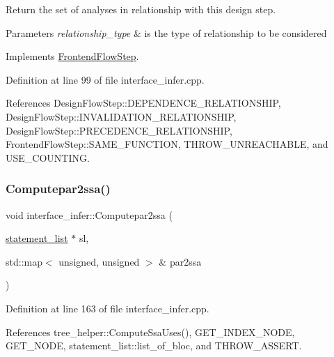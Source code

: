 Return the set of analyses in relationship with this design step. 


\begin{DoxyParams}{Parameters}
{\em relationship\+\_\+type} & is the type of relationship to be considered \\
\hline
\end{DoxyParams}


Implements \hyperlink{classFrontendFlowStep_abeaff70b59734e462d347ed343dd700d}{Frontend\+Flow\+Step}.



Definition at line 99 of file interface\+\_\+infer.\+cpp.



References Design\+Flow\+Step\+::\+D\+E\+P\+E\+N\+D\+E\+N\+C\+E\+\_\+\+R\+E\+L\+A\+T\+I\+O\+N\+S\+H\+IP, Design\+Flow\+Step\+::\+I\+N\+V\+A\+L\+I\+D\+A\+T\+I\+O\+N\+\_\+\+R\+E\+L\+A\+T\+I\+O\+N\+S\+H\+IP, Design\+Flow\+Step\+::\+P\+R\+E\+C\+E\+D\+E\+N\+C\+E\+\_\+\+R\+E\+L\+A\+T\+I\+O\+N\+S\+H\+IP, Frontend\+Flow\+Step\+::\+S\+A\+M\+E\+\_\+\+F\+U\+N\+C\+T\+I\+ON, T\+H\+R\+O\+W\+\_\+\+U\+N\+R\+E\+A\+C\+H\+A\+B\+LE, and U\+S\+E\+\_\+\+C\+O\+U\+N\+T\+I\+NG.

\mbox{\label{classinterface__infer_a5da918cda06334bf2d7b6828c90ede34}} 
\subsubsection{\texorpdfstring{Computepar2ssa()}{Computepar2ssa()}}
{\footnotesize\ttfamily void interface\+\_\+infer\+::\+Computepar2ssa (\begin{DoxyParamCaption}\item[{\hyperlink{structstatement__list}{statement\+\_\+list} $\ast$}]{sl,  }\item[{std\+::map$<$ unsigned, unsigned $>$ \&}]{par2ssa }\end{DoxyParamCaption})\hspace{0.3cm}{\ttfamily [private]}}



Definition at line 163 of file interface\+\_\+infer.\+cpp.



References tree\+\_\+helper\+::\+Compute\+Ssa\+Uses(), G\+E\+T\+\_\+\+I\+N\+D\+E\+X\+\_\+\+N\+O\+DE, G\+E\+T\+\_\+\+N\+O\+DE, statement\+\_\+list\+::list\+\_\+of\+\_\+bloc, and T\+H\+R\+O\+W\+\_\+\+A\+S\+S\+E\+RT.



